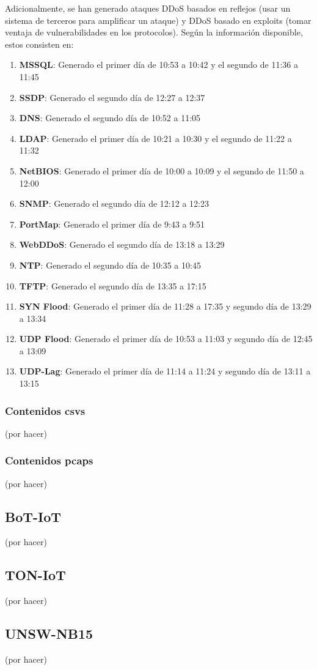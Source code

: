 Adicionalmente, se han generado ataques DDoS basados en reflejos (usar un sistema de terceros para amplificar un ataque) y DDoS basado en exploits (tomar ventaja de vulnerabilidades en los protocolos). Según la información disponible, estos consisten en:

\begin{enumerate}
    \item \textbf{MSSQL}: Generado el primer día de 10:53 a 10:42 y el segundo de 11:36 a 11:45
    \item \textbf{SSDP}: Generado el segundo día de 12:27 a 12:37
    \item \textbf{DNS}: Generado el segundo día de 10:52 a 11:05
    \item \textbf{LDAP}: Generado el primer día de 10:21 a 10:30 y el segundo de 11:22 a 11:32
    \item \textbf{NetBIOS}: Generado el primer día de 10:00 a 10:09 y el segundo de 11:50 a 12:00
    \item \textbf{SNMP}: Generado el segundo día de 12:12 a 12:23
    \item \textbf{PortMap}: Generado el primer día de 9:43 a 9:51
    \item \textbf{WebDDoS}: Generado el segundo día de 13:18 a 13:29
    \item \textbf{NTP}: Generado el segundo día de 10:35 a 10:45
    \item \textbf{TFTP}: Generado el segundo día de 13:35 a 17:15
    \item \textbf{SYN Flood}: Generado el primer día de 11:28 a 17:35 y segundo día de 13:29 a 13:34
    \item \textbf{UDP Flood}: Generado el primer día de 10:53 a 11:03 y segundo día de 12:45 a 13:09
    \item \textbf{UDP-Lag}: Generado el primer día de 11:14 a 11:24 y segundo día de 13:11 a 13:15
\end{enumerate}

\subsubsection{Contenidos csvs}

(por hacer)

\subsubsection{Contenidos pcaps}

(por hacer)

\subsection{BoT-IoT}

(por hacer)

\subsection{TON-IoT}

(por hacer)

\subsection{UNSW-NB15}

(por hacer)
